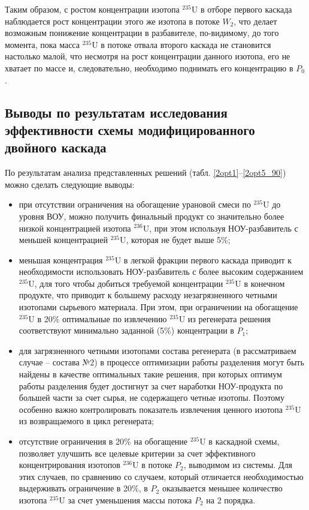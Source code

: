 Таким образом, с ростом концентрации изотопа $^{235}$U в отборе первого каскада наблюдается рост концентрации этого же изотопа в потоке $W_2$, что делает возможным понижение концентрации в разбавителе, по-видимому, до того момента, пока масса $^{235}$U в потоке отвала второго каскада не становится настолько малой, что несмотря на рост концентрации данного изотопа, его не хватает по массе и, следовательно, необходимо поднимать его концентрацию в $P_0$.


\subsection{Выводы по результатам исследования эффективности схемы модифицированного двойного каскада}


По результатам анализа представленных решений (табл. \ref{2opt1}--\ref{2opt5_90}) можно сделать следующие выводы:
\begin{itemize}
    \item при отсутствии ограничения на обогащение урановой смеси по $^{235}$U до уровня ВОУ, можно получить финальный продукт со значительно более низкой концентрацией изотопа $^{236}$U, при этом используя НОУ-разбавитель с меньшей концентрацией $^{235}$U, которая не будет выше 5\%;
    \item меньшая концентрация $^{235}$U в легкой фракции первого каскада приводит к необходимости использовать НОУ-разбавитель с более высоким содержанием $^{235}$U, для того чтобы добиться требуемой концентрации $^{235}$U в конечном продукте, что приводит к большему расходу незагрязненного четными изотопами сырьевого материала. При этом, при ограничении на обогащение $^{235}$U в 20\% оптимальные по извлечению $^{235}$U из регенерата решения соответствуют минимально заданной (5\%) концентрации в $P_1$;
    \item для загрязненного четными изотопами состава регенерата (в рассматриваем случае -- состава №2) в процессе оптимизации работы разделения могут быть найдены в качестве оптимальных такие решения, при которых оптимум работы разделения будет достигнут за счет наработки НОУ-продукта по большей части за счет сырья, не содержащего четные изотопы. Поэтому особенно важно контролировать показатель извлечения ценного изотопа $^{235}$U из возвращаемого в цикл регенерата;
    \item отсутствие ограничения в 20\% на обогащение $^{235}$U в каскадной схемы, позволяет улучшить все целевые критерии за счет эффективного концентрирования изотопов $^{236}$U в потоке $P_2$, выводимом из системы. Для этих случаев, по сравнению со случаем, который отличается необходимостью выдерживать ограничение в 20\%, в $P_2$ оказывается меньшее количество изотопа $^{235}$U за счет уменьшения массы потока $P_2$ на 2 порядка. 
\end{itemize}



